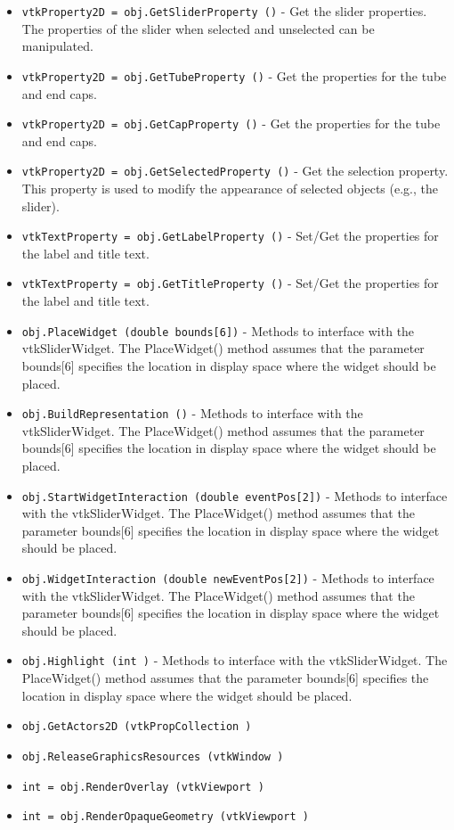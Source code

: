 \begin{itemize}
\item  \verb|vtkProperty2D = obj.GetSliderProperty ()| -  Get the slider properties. The properties of the slider when selected 
 and unselected can be manipulated.

\item  \verb|vtkProperty2D = obj.GetTubeProperty ()| -  Get the properties for the tube and end caps. 

\item  \verb|vtkProperty2D = obj.GetCapProperty ()| -  Get the properties for the tube and end caps. 

\item  \verb|vtkProperty2D = obj.GetSelectedProperty ()| -  Get the selection property. This property is used to modify the appearance of
 selected objects (e.g., the slider).

\item  \verb|vtkTextProperty = obj.GetLabelProperty ()| -  Set/Get the properties for the label and title text.

\item  \verb|vtkTextProperty = obj.GetTitleProperty ()| -  Set/Get the properties for the label and title text.

\item  \verb|obj.PlaceWidget (double bounds[6])| -  Methods to interface with the vtkSliderWidget. The PlaceWidget() method
 assumes that the parameter bounds[6] specifies the location in display space
 where the widget should be placed.

\item  \verb|obj.BuildRepresentation ()| -  Methods to interface with the vtkSliderWidget. The PlaceWidget() method
 assumes that the parameter bounds[6] specifies the location in display space
 where the widget should be placed.

\item  \verb|obj.StartWidgetInteraction (double eventPos[2])| -  Methods to interface with the vtkSliderWidget. The PlaceWidget() method
 assumes that the parameter bounds[6] specifies the location in display space
 where the widget should be placed.

\item  \verb|obj.WidgetInteraction (double newEventPos[2])| -  Methods to interface with the vtkSliderWidget. The PlaceWidget() method
 assumes that the parameter bounds[6] specifies the location in display space
 where the widget should be placed.

\item  \verb|obj.Highlight (int )| -  Methods to interface with the vtkSliderWidget. The PlaceWidget() method
 assumes that the parameter bounds[6] specifies the location in display space
 where the widget should be placed.

\item  \verb|obj.GetActors2D (vtkPropCollection )|

\item  \verb|obj.ReleaseGraphicsResources (vtkWindow )|

\item  \verb|int = obj.RenderOverlay (vtkViewport )|

\item  \verb|int = obj.RenderOpaqueGeometry (vtkViewport )|

\end{itemize}
